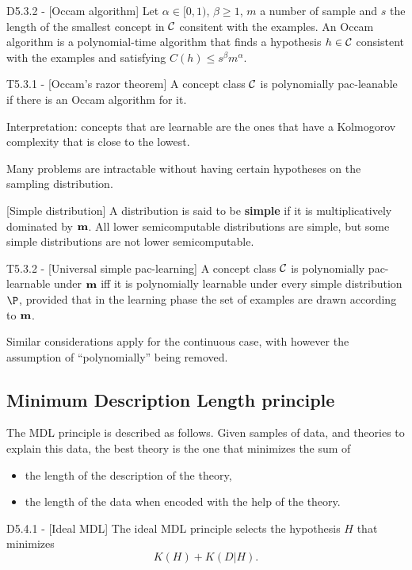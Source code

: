 \documentclass{article}
\begin{document}
\begin{flexidefinition}{D5.3.2 - }[Occam algorithm]
    Let $\alpha \in [0,1)$, $\beta \geq 1$, $m$ a number of sample and $s$ the length of the smallest concept in $\mathcal{C}$ consitent with the examples. An Occam algorithm is a polynomial-time algorithm that finds a hypothesis $h \in \mathcal{C}$ consistent with the examples and satisfying $C(h) \leq s^\beta m^\alpha$.
\end{flexidefinition}

\begin{flexitheorem}{T5.3.1 - }[Occam's razor theorem]
    A concept class $\mathcal{C}$ is polynomially pac-leanable if there is an Occam algorithm for it.
\end{flexitheorem}

Interpretation: concepts that are learnable are the ones that have a Kolmogorov complexity that is close to the lowest.

Many problems are intractable without having certain hypotheses on the sampling distribution.

\begin{flexidefinition}{}[Simple distribution]
    A distribution is said to be \textbf{simple} if it is multiplicatively dominated by ${\bf m}$. All lower semicomputable distributions are simple, but some simple distributions are not lower semicomputable.
\end{flexidefinition}

\begin{flexitheorem}{T5.3.2 - }[Universal simple pac-learning]
    A concept class $\mathcal{C}$ is polynomially pac-learnable under ${\bf m}$ iff it is polynomially learnable under every simple distribution $\P$, provided that in the learning phase the set of examples are drawn according to ${\bf m}$.
\end{flexitheorem}

 Similar considerations apply for the continuous case, with however the assumption of ``polynomially'' being removed.

\subsection{Minimum Description Length principle}

The MDL principle is described as follows. Given samples of data, and theories to explain this data, the best theory is the one that minimizes the sum of 
\begin{itemize}
    \item the length of the description of the theory,
    \item the length of the data when encoded with the help of the theory.
\end{itemize}
\begin{flexidefinition}{D5.4.1 - }[Ideal MDL]
    The ideal MDL principle selects the hypothesis $H$ that minimizes 
    \begin{equation}
        K(H) + K(D|H).
    \end{equation}
\end{flexidefinition}
\end{document}
